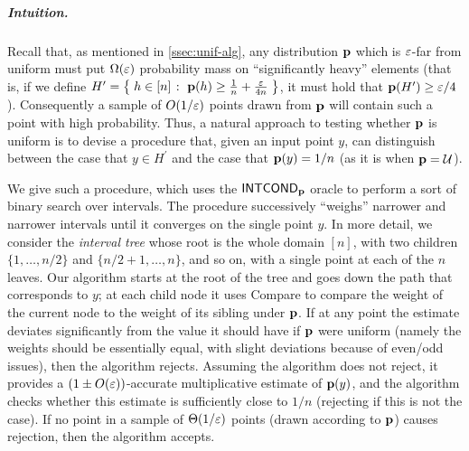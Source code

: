 \subparagraph{Intuition.}  Recall that, as mentioned in
\cref{ssec:unif-alg}, any distribution $\mathbf{p}$ which is $\varepsilon$-far
from uniform must put $\Omega(\varepsilon)$ probability mass on ``significantly
heavy'' elements (that is, if we define \mbox{$H' = \left\{\;  h
\in [n] \;\colon\; \mathbf{p}(h) \geq \frac{1}{n} + {\frac{\varepsilon}{4n}}\; \right\}$}, it must hold
that $\mathbf{p}(H') \geq \varepsilon/4$).
Consequently a sample of $O(1/\varepsilon)$ points drawn from $\mathbf{p}$
will contain such a point with high
probability. Thus, a natural approach to testing whether $\mathbf{p}$ is uniform
is to devise a procedure that, given an input point $y$, can
distinguish between the case that $y \in H^\prime$ and the case that
$\mathbf{p}(y)=1/n$ (as it is when $\mathbf{p}= \mathcal{U}$).

\noindent We give such a procedure, which uses
the ${\sf INTCOND}_{\mathbf{p}}$ oracle to perform a sort of
binary search over intervals.   The procedure successively
``weighs'' narrower and narrower intervals until it converges
on the single point $y$.
In more detail, we
consider the \emph{interval tree} whose root is
the whole domain $[n]$, with  two children
$\{1,\dots,n/2\}$ and $\{n/2+1,\dots, n\}$, and so on, with a single
point at each of the $n$ leaves.
Our algorithm starts at the root of the tree and
goes down the path that corresponds to $y$; at each child node
it uses {\sc Compare} to compare the weight of the current node to the
weight of its sibling under $\mathbf{p}$.
If at any point the estimate deviates significantly from the value it
should have if $\mathbf{p}$ were uniform (namely the weights should be essentially
equal, with slight deviations because of even/odd issues),
then the algorithm rejects.
Assuming the algorithm does not reject, it provides a
$(1\pm O(\varepsilon))$-accurate
multiplicative estimate of $\mathbf{p}(y)$, and the algorithm checks
whether this estimate is sufficiently close to $1/n$ (rejecting if this
is not the case). If no point in a sample of $\Theta(1/\varepsilon)$ points (drawn according to $\mathbf{p}$) causes rejection, then the algorithm accepts.

